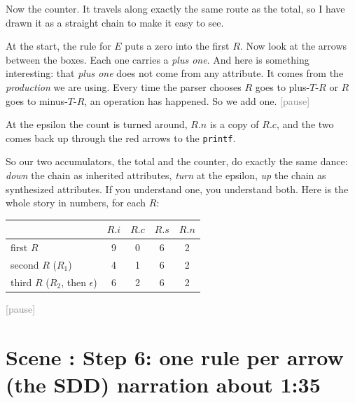 \documentclass[11pt,a4paper]{article}
\newcommand{\pause}{\textcolor{gray}{\textsf{[pause]}}}
\newcounter{scene}
\newcommand{\scene}[2]{\stepcounter{scene}\needspace{20\baselineskip}\section*{Scene \thescene: #1 \hfill {\normalfont\small #2}}}
\begin{document}
\begin{narration}
Now the counter. It travels along exactly the same route as the total, so I have drawn it as a straight chain to make it easy to see.

At the start, the rule for $E$ puts a zero into the first $R$. Now look at the arrows between the boxes. Each one carries a \emph{plus one}. And here is something interesting: that \emph{plus one} does not come from any attribute. It comes from the \emph{production} we are using. Every time the parser chooses $R$ goes to plus-$T$-$R$ or $R$ goes to minus-$T$-$R$, an operation has happened. So we add one. \pause

At the epsilon the count is turned around, $R.n$ is a copy of $R.c$, and the two comes back up through the red arrows to the \texttt{printf}.

So our two accumulators, the total and the counter, do exactly the same dance: \emph{down} the chain as inherited attributes, \emph{turn} at the epsilon, \emph{up} the chain as synthesized attributes. If you understand one, you understand both. Here is the whole story in numbers, for each $R$:
\begin{center}
\small
\begin{tabular}{@{}l c c c c@{}}
\toprule
 & $R.i$ & $R.c$ & $R.s$ & $R.n$ \\ \midrule
first $R$ & 9 & 0 & 6 & 2 \\
second $R$ ($R_1$) & 4 & 1 & 6 & 2 \\
third $R$ ($R_2$, then $\epsilon$) & 6 & 2 & 6 & 2 \\ \bottomrule
\end{tabular}
\end{center}
\pause
\end{narration}

\scene{Step 6: one rule per arrow (the SDD)}{narration about 1:35}
\end{document}
